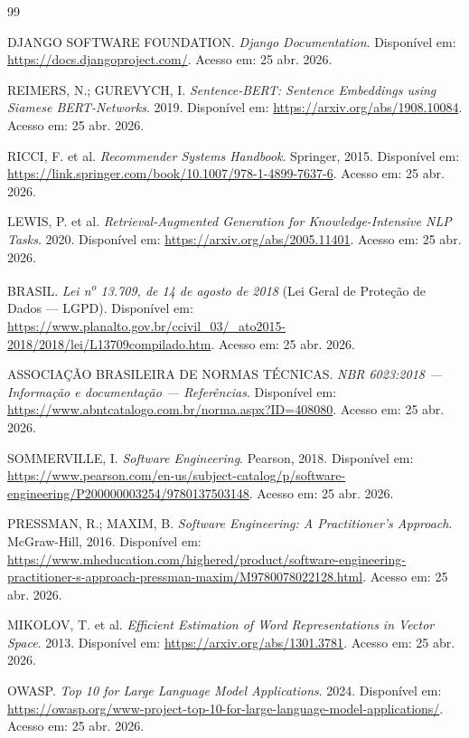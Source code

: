 \documentclass[monografia,abnt]{inf-ufg-modificado}
\begin{document}
\begin{thebibliography}{99}

DJANGO SOFTWARE FOUNDATION. \textit{Django Documentation}. Disponível em: \url{https://docs.djangoproject.com/}. Acesso em: 25 abr. 2026.

REIMERS, N.; GUREVYCH, I. \textit{Sentence-BERT: Sentence Embeddings using Siamese BERT-Networks}. 2019. Disponível em: \url{https://arxiv.org/abs/1908.10084}. Acesso em: 25 abr. 2026.

RICCI, F. et al. \textit{Recommender Systems Handbook}. Springer, 2015. Disponível em: \url{https://link.springer.com/book/10.1007/978-1-4899-7637-6}. Acesso em: 25 abr. 2026.

LEWIS, P. et al. \textit{Retrieval-Augmented Generation for Knowledge-Intensive NLP Tasks}. 2020. Disponível em: \url{https://arxiv.org/abs/2005.11401}. Acesso em: 25 abr. 2026.

BRASIL. \textit{Lei n\textsuperscript{o} 13.709, de 14 de agosto de 2018} (Lei Geral de Proteção de Dados --- LGPD). Disponível em: \url{https://www.planalto.gov.br/ccivil_03/_ato2015-2018/2018/lei/L13709compilado.htm}. Acesso em: 25 abr. 2026.

ASSOCIAÇÃO BRASILEIRA DE NORMAS TÉCNICAS. \textit{NBR 6023:2018 --- Informação e documentação --- Referências}. Disponível em: \url{https://www.abntcatalogo.com.br/norma.aspx?ID=408080}. Acesso em: 25 abr. 2026.

SOMMERVILLE, I. \textit{Software Engineering}. Pearson, 2018. Disponível em: \url{https://www.pearson.com/en-us/subject-catalog/p/software-engineering/P200000003254/9780137503148}. Acesso em: 25 abr. 2026.

PRESSMAN, R.; MAXIM, B. \textit{Software Engineering: A Practitioner's Approach}. McGraw-Hill, 2016. Disponível em: \url{https://www.mheducation.com/highered/product/software-engineering-practitioner-s-approach-pressman-maxim/M9780078022128.html}. Acesso em: 25 abr. 2026.

MIKOLOV, T. et al. \textit{Efficient Estimation of Word Representations in Vector Space}. 2013. Disponível em: \url{https://arxiv.org/abs/1301.3781}. Acesso em: 25 abr. 2026.

OWASP. \textit{Top 10 for Large Language Model Applications}. 2024. Disponível em: \url{https://owasp.org/www-project-top-10-for-large-language-model-applications/}. Acesso em: 25 abr. 2026.


\end{thebibliography}
\end{document}
